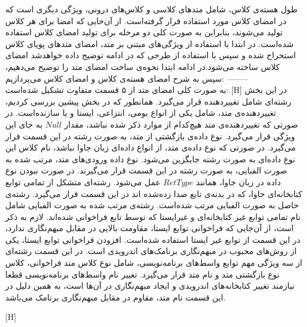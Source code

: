  طول هسته‌ی کلاس، شامل متد‌های کلاسی و کلاس‌های درونی، ویژگی دیگری است که در امضای کلاس مورد استفاده قرار گرفته‌است. 
از آن‌حایی که امضا برای هر کلاس تولید می‌شوند، بنابراین به صورت کلی دو مرحله برای تولید امضا‌ی کلاس استفاده شده‌است. در ابتدا با استفاده از ویژگی‌های مبتنی بر متد، امضای متد‌های پویای کلاس استحراج شده و سپس با استفاده از طرحی که در ادامه توضیح داده خواهد‌شد امضای کلاس ساخته می‌شود.در ادامه ابتدا نحوه‌ی ساخت امضای متد را توضیح می‌دهیم، سپس به شرح امضای هسته‌ی کلاس و امضای کلاس می‌پردازیم:‌ 
--------
\\
به صورت کلی امضای متد از ۵ قسمت متفاوت تشکیل شده‌است:‌
[H]
\vspace{1em}
 در این بخش رشته‌ای شامل تغییردهنده‌ قرار می‌گیرد. همانطور که در بخش پیشین بررسی کردیم، تغییردهنده‌ی متد، شامل یکی از انواع بومی، انتزاعی، ایستا و یا سازنده‌است. در صورتی که تغییردهنده‌ی متد هیچ‌کدام از موارد ذکر شده نباشد، مقدار $Null$ به جای این ویژگی قرار می‌گیرد.
 نوع داده‌ی بازگشتی از متد، به صورت رشته در این قسمت قرار می‌گیرد. در صورتی که نوع داده‌ی متد، از انواع داده‌ای زبان جاوا نباشد، نام کلاس این نوع داده‌ای به صورت رشته جایگزین می‌شود.
 نوع داده‌ ورودی‌های متد، مرتب شده به صورت الفبایی، به صورت رشته در این قسمت قرار می‌گیرند. در صورت نبودن نوع داده در زبان جاوا، همانند $RetType$ عمل می‌شود.
 رشته‌ای متشکل از تمامی توابع کتابخانه‌ای جاوا، که در بدنه‌ی تابع صدا زده‌شده اند در این قسمت قرار می‌گیرد. رشته‌ی حاصل به صورت الفبایی مرتب شده‌است.
 رشته‌ی مرتب شده به صورت الفبایی شامل نام تمامی توابع غیر کتابخانه‌ای و غیرایستا که توسط تابع فراخوانی شده‌اند. لازم به ذکر است، از آن‌جایی که فراخوانی توابع ایستا، مقاومت بالایی در مقابل مبهم‌نگاری ندارد، در این قسمت از توابع غیر ایستا استفاده شده‌است. افزودن فراخوانی توابع ایستا، یکی از روش‌های محبوب در مبهم‌نگاری برنامک‌های اندرویدی است.
 در این قسمت رشته‌ای از سه ویژگی مهم توابع واسط‌های برنامه‌نویسی، شامل نوع کلاس متد فراخوانی، کلاس نوع بازگشتی متد و نام متد قرار می‌گیرد. تغییر نام واسط‌های برنامه‌نویسی قطعا نیازمند تغییر کتابخانه‌های اندرویدی و ایجاد مبهم‌نگاری در آن‌ها است، به همین دلیل در این قسمت نام متد، مقاوم در مقابل مبهم‌نگاری برنامک می‌باشد.

[H]
\vspace{1em}

